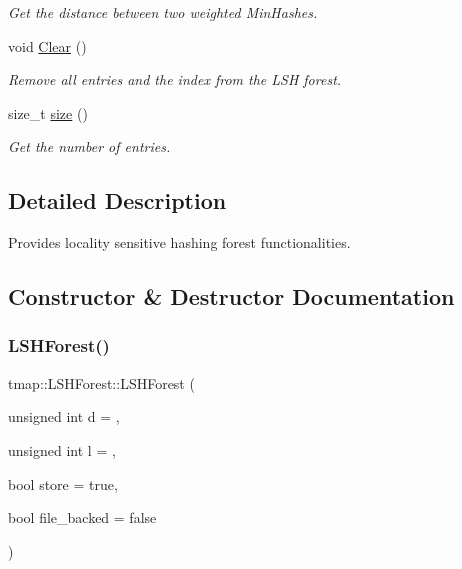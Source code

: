 \begin{DoxyCompactItemize}
\begin{DoxyCompactList}\small\item\em Get the distance between two weighted Min\+Hashes. \end{DoxyCompactList}\item 
\mbox{\label{classtmap_1_1LSHForest_a9ee2595fb0f85d917989234ab4aaee8d}} 
void \hyperlink{classtmap_1_1LSHForest_a9ee2595fb0f85d917989234ab4aaee8d}{Clear} ()
\begin{DoxyCompactList}\small\item\em Remove all entries and the index from the L\+SH forest. \end{DoxyCompactList}\item 
size\+\_\+t \hyperlink{classtmap_1_1LSHForest_a8ba5c1f500e915c6717c64ac24744874}{size} ()
\begin{DoxyCompactList}\small\item\em Get the number of entries. \end{DoxyCompactList}\end{DoxyCompactItemize}


\subsection{Detailed Description}
Provides locality sensitive hashing forest functionalities. 

\subsection{Constructor \& Destructor Documentation}
\mbox{\label{classtmap_1_1LSHForest_a153cb1f5090432257a17f2e9dacc32a0}} 
\subsubsection{\texorpdfstring{L\+S\+H\+Forest()}{LSHForest()}}
{\footnotesize\ttfamily tmap\+::\+L\+S\+H\+Forest\+::\+L\+S\+H\+Forest (\begin{DoxyParamCaption}\item[{unsigned int}]{d = {},  }\item[{unsigned int}]{l = {},  }\item[{bool}]{store = {\ttfamily true},  }\item[{bool}]{file\+\_\+backed = {\ttfamily false} }\end{DoxyParamCaption})}



